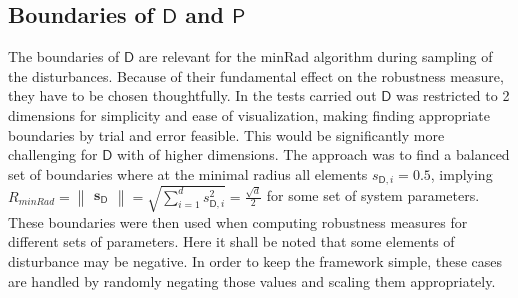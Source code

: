 


\subsection{Boundaries of $\mathsf{D}$ and $\mathsf{P}$ } \label{bounds}

    The boundaries of $\mathsf{D}$ are relevant for the minRad algorithm during sampling of the disturbances. Because of their fundamental effect on the robustness measure, they have to be chosen thoughtfully. In the tests carried out $\mathsf{D}$ was restricted to 2 dimensions for simplicity and ease of visualization, making finding appropriate boundaries by trial and error feasible. This would be significantly more challenging for $\mathsf{D}$ with of higher dimensions. The approach was to find a balanced set of boundaries where at the minimal radius all elements $s_{\mathsf{D},i} = 0.5$, implying $R_{minRad} = \begin{Vmatrix}\mathbf{s}_{\mathsf{D}}\end{Vmatrix}= \sqrt{\sum_{i=1}^{d} s_{\mathsf{D},i}^2} = \frac{\sqrt{d}}{2}$ for some set of system parameters. These boundaries were then used when computing robustness measures for different sets of parameters. 
    Here it shall be noted that some elements of disturbance may be negative. In order to keep the framework simple, these cases are handled by randomly negating those values and scaling them appropriately. 

 



